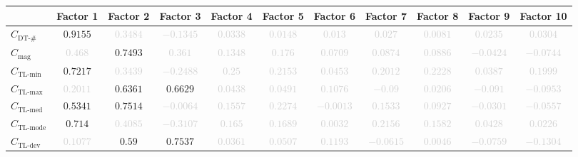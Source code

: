 \documentclass{standalone}
\newcommand{\magnitudename}{\text{mag}}
\newcommand{\magnitude}{C_{\magnitudename}}
\newcommand{\tlminname}{\text{TL-min}}
\newcommand{\tlmin}{C_{\tlminname}}
\newcommand{\tlmaxname}{\text{TL-max}}
\newcommand{\tlmax}{C_{\tlmaxname}}
\newcommand{\tlmedname}{\text{TL-med}}
\newcommand{\tlmed}{C_{\tlmedname}}
\newcommand{\tlmodename}{\text{TL-mode}}
\newcommand{\tlmode}{C_{\tlmodename}}
\newcommand{\tldevname}{\text{TL-dev}}
\newcommand{\tldev}{C_{\tldevname}}
\newcommand{\numberuniquetracesname}{\text{DT-\#}}
\newcommand{\numberuniquetraces}{C_{\numberuniquetracesname}}
\begin{document}
\begin{tabular}{lcccccccccc} \toprule 
 & \textbf{Factor 1} & \textbf{Factor 2} & \textbf{Factor 3} & \textbf{Factor 4} & \textbf{Factor 5} & \textbf{Factor 6} & \textbf{Factor 7} & \textbf{Factor 8} & \textbf{Factor 9} & \textbf{Factor 10} \\ \midrule 
$\numberuniquetraces$ & $0.9155$ & \textcolor{lightgray}{$0.3484$} & \textcolor{lightgray}{$-0.1345$} & \textcolor{lightgray}{$0.0338$} & \textcolor{lightgray}{$0.0148$} & \textcolor{lightgray}{$0.013$} & \textcolor{lightgray}{$0.027$} & \textcolor{lightgray}{$0.0081$} & \textcolor{lightgray}{$0.0235$} & \textcolor{lightgray}{$0.0304$} \\ 
$\magnitude$ & \textcolor{lightgray}{$0.468$} & $0.7493$ & \textcolor{lightgray}{$0.361$} & \textcolor{lightgray}{$0.1348$} & \textcolor{lightgray}{$0.176$} & \textcolor{lightgray}{$0.0709$} & \textcolor{lightgray}{$0.0874$} & \textcolor{lightgray}{$0.0886$} & \textcolor{lightgray}{$-0.0424$} & \textcolor{lightgray}{$-0.0744$} \\ 
$\tlmin$ & $0.7217$ & \textcolor{lightgray}{$0.3439$} & \textcolor{lightgray}{$-0.2488$} & \textcolor{lightgray}{$0.25$} & \textcolor{lightgray}{$0.2153$} & \textcolor{lightgray}{$0.0453$} & \textcolor{lightgray}{$0.2012$} & \textcolor{lightgray}{$0.2228$} & \textcolor{lightgray}{$0.0387$} & \textcolor{lightgray}{$0.1999$} \\ 
$\tlmax$ & \textcolor{lightgray}{$0.2011$} & $0.6361$ & $0.6629$ & \textcolor{lightgray}{$0.0438$} & \textcolor{lightgray}{$0.0491$} & \textcolor{lightgray}{$0.1076$} & \textcolor{lightgray}{$-0.09$} & \textcolor{lightgray}{$0.0206$} & \textcolor{lightgray}{$-0.091$} & \textcolor{lightgray}{$-0.0953$} \\ 
$\tlmed$ & $0.5341$ & $0.7514$ & \textcolor{lightgray}{$-0.0064$} & \textcolor{lightgray}{$0.1557$} & \textcolor{lightgray}{$0.2274$} & \textcolor{lightgray}{$-0.0013$} & \textcolor{lightgray}{$0.1533$} & \textcolor{lightgray}{$0.0927$} & \textcolor{lightgray}{$-0.0301$} & \textcolor{lightgray}{$-0.0557$} \\ 
$\tlmode$ & $0.714$ & \textcolor{lightgray}{$0.4085$} & \textcolor{lightgray}{$-0.3107$} & \textcolor{lightgray}{$0.165$} & \textcolor{lightgray}{$0.1689$} & \textcolor{lightgray}{$0.0032$} & \textcolor{lightgray}{$0.2156$} & \textcolor{lightgray}{$0.1582$} & \textcolor{lightgray}{$0.0428$} & \textcolor{lightgray}{$0.0226$} \\ 
$\tldev$ & \textcolor{lightgray}{$0.1077$} & $0.59$ & $0.7537$ & \textcolor{lightgray}{$0.0361$} & \textcolor{lightgray}{$0.0507$} & \textcolor{lightgray}{$0.1193$} & \textcolor{lightgray}{$-0.0615$} & \textcolor{lightgray}{$0.0046$} & \textcolor{lightgray}{$-0.0759$} & \textcolor{lightgray}{$-0.1304$} \\ 

\end{tabular}
\end{document}

